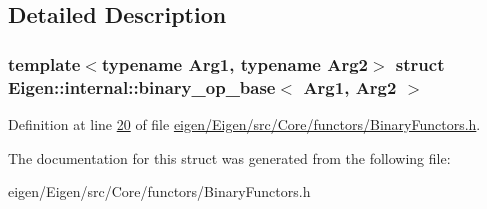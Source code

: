 \subsection{Detailed Description}
\subsubsection*{template$<$typename Arg1, typename Arg2$>$\newline
struct Eigen\+::internal\+::binary\+\_\+op\+\_\+base$<$ Arg1, Arg2 $>$}



Definition at line \hyperlink{eigen_2_eigen_2src_2_core_2functors_2_binary_functors_8h_source_l00020}{20} of file \hyperlink{eigen_2_eigen_2src_2_core_2functors_2_binary_functors_8h_source}{eigen/\+Eigen/src/\+Core/functors/\+Binary\+Functors.\+h}.



The documentation for this struct was generated from the following file\+:\begin{DoxyCompactItemize}
\item 
eigen/\+Eigen/src/\+Core/functors/\+Binary\+Functors.\+h\end{DoxyCompactItemize}
